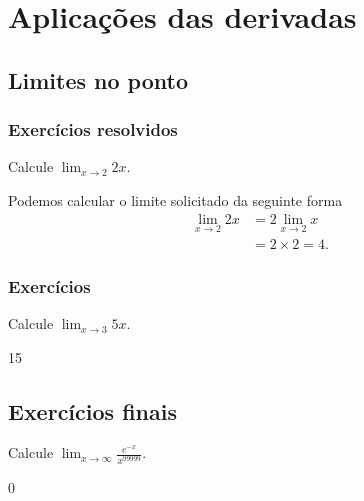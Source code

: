 
\chapter{Aplicações das derivadas}\label{cap:apl_derivadas}

\emconstrucao

\section{Limites no ponto}

\construirSec

\subsection*{Exercícios resolvidos}

\construirExeresol

\begin{exeresol}
  Calcule $\lim_{x\to 2} 2x$.
\end{exeresol}
\begin{resol}
  Podemos calcular o limite solicitado da seguinte forma
  \begin{equation}
    \begin{split}
      \lim_{x\to 2} 2x &= 2\lim_{x\to 2} x\\
      &= 2\times 2 = 4.
    \end{split}
  \end{equation}
\end{resol}

\subsection*{Exercícios}

\construirExer

\begin{exer}
  Calcule $\lim_{x\to 3} 5x$.
\end{exer}
\begin{resp}
  15
\end{resp}

\section{Exercícios finais}

\construirExer

\begin{exer}
  Calcule $\displaystyle\lim_{x\to \infty} \frac{e^{-x}}{x^{99999}}$.
\end{exer}
\begin{resp}
  0
\end{resp}

